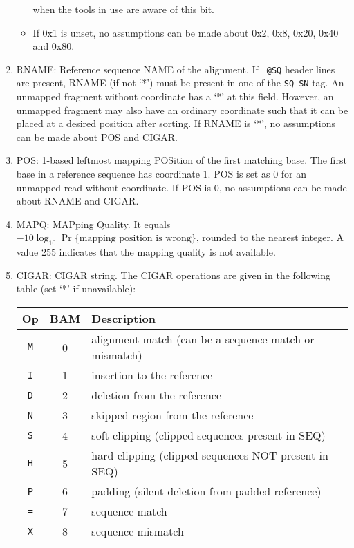 \documentclass[10pt]{article}
\begin{document}
\begin{enumerate}
\begin{itemize}
    when the tools in use are aware of this bit.
  \item If 0x1 is unset, no assumptions can be made about 0x2, 0x8,
    0x20, 0x40 and 0x80.
  \end{itemize}
\item {\sf RNAME}: Reference sequence NAME of the alignment. If {\tt
    @SQ} header lines are present, {\sf RNAME} (if not `*') must be
  present in one of the {\tt SQ-SN} tag. An unmapped fragment without
  coordinate has a `*' at this field. However, an unmapped fragment may
  also have an ordinary coordinate such that it can be placed at a
  desired position after sorting. If {\sf RNAME} is `*', no assumptions
  can be made about {\sf POS} and {\sf CIGAR}.
\item {\sf POS}: 1-based leftmost mapping POSition of the first matching
  base. The first base in a reference sequence has coordinate 1. {\sf
    POS} is set as 0 for an unmapped read without coordinate. If {\sf
    POS} is 0, no assumptions can be made about {\sf RNAME} and {\sf
    CIGAR}.
\item {\sf MAPQ}: MAPping Quality. It equals
  $-10\log_{10}\Pr\{\mbox{mapping position is wrong}\}$, rounded to the
  nearest integer. A value 255 indicates that the mapping quality is not
  available.
\item {\sf CIGAR}: CIGAR string. The CIGAR operations are given in the
  following table (set `*' if unavailable):
  \begin{center}\small
  \begin{tabular}{ccl}
  \hline
  Op & BAM & Description\\
  \hline
  {\tt M} & 0 & alignment match (can be a sequence match or mismatch)\\
  {\tt I} & 1 & insertion to the reference \\
  {\tt D} & 2 & deletion from the reference \\
  {\tt N} & 3 & skipped region from the reference \\
  {\tt S} & 4 & soft clipping (clipped sequences present in {\sf SEQ})\\
  {\tt H} & 5 & hard clipping (clipped sequences NOT present in {\sf SEQ})\\
  {\tt P} & 6 & padding (silent deletion from padded reference)\\
  {\tt =} & 7 & sequence match \\
  {\tt X} & 8 & sequence mismatch \\
  \hline
  \end{tabular}

\end{center}
\end{enumerate}
\end{document}
